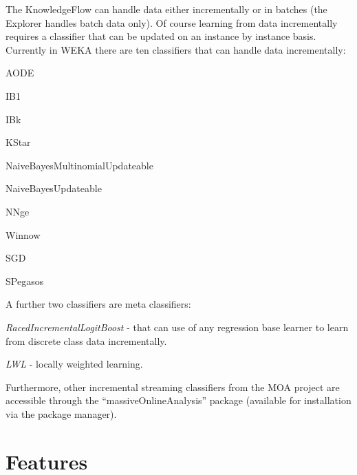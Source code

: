 The KnowledgeFlow can handle data either incrementally or in batches
(the Explorer handles batch data only). Of course learning from data
incrementally requires a classifier that can be updated on an instance
by instance basis. Currently in WEKA there are ten classifiers that
can handle data incrementally:
\begin{tight_itemize}
	\item AODE
	\item IB1
	\item IBk
	\item KStar
	\item NaiveBayesMultinomialUpdateable
	\item NaiveBayesUpdateable
	\item NNge
	\item Winnow
        \item SGD
        \item SPegasos
\end{tight_itemize}

\noindent A further two classifiers are meta classifiers:
\begin{tight_itemize}
	\item \textit{RacedIncrementalLogitBoost} - that can use of any regression base
learner to learn from discrete class data incrementally.
	\item \textit{LWL} - locally weighted learning.
\end{tight_itemize}

Furthermore, other incremental streaming classifiers from the MOA
project are accessible through the ``massiveOnlineAnalysis'' package
(available for installation via the package manager).


\newpage
\section{Features}

